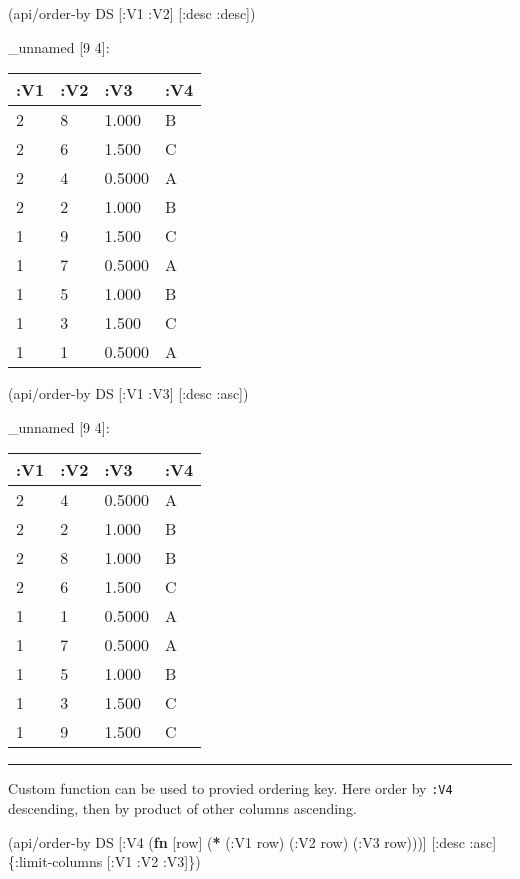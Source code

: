 \documentclass[]{article}
\newenvironment{Shaded}{\begin{snugshade}}{\end{snugshade}}
\newcommand{\KeywordTok}[1]{\textcolor[rgb]{0.13,0.29,0.53}{\textbf{#1}}}
\newcommand{\AttributeTok}[1]{\textcolor[rgb]{0.77,0.63,0.00}{#1}}
\newcommand{\NormalTok}[1]{#1}
\begin{document}
\begin{Shaded}
\begin{Highlighting}[]
\NormalTok{(api/order-by DS [}\AttributeTok{:V1} \AttributeTok{:V2}\NormalTok{] [}\AttributeTok{:desc} \AttributeTok{:desc}\NormalTok{])}
\end{Highlighting}
\end{Shaded}

\_unnamed {[}9 4{]}:

\begin{longtable}[]{@{}llll@{}}
\toprule
:V1 & :V2 & :V3 & :V4\tabularnewline
\midrule
\endhead
2 & 8 & 1.000 & B\tabularnewline
2 & 6 & 1.500 & C\tabularnewline
2 & 4 & 0.5000 & A\tabularnewline
2 & 2 & 1.000 & B\tabularnewline
1 & 9 & 1.500 & C\tabularnewline
1 & 7 & 0.5000 & A\tabularnewline
1 & 5 & 1.000 & B\tabularnewline
1 & 3 & 1.500 & C\tabularnewline
1 & 1 & 0.5000 & A\tabularnewline
\bottomrule
\end{longtable}

\begin{Shaded}
\begin{Highlighting}[]
\NormalTok{(api/order-by DS [}\AttributeTok{:V1} \AttributeTok{:V3}\NormalTok{] [}\AttributeTok{:desc} \AttributeTok{:asc}\NormalTok{])}
\end{Highlighting}
\end{Shaded}

\_unnamed {[}9 4{]}:

\begin{longtable}[]{@{}llll@{}}
\toprule
:V1 & :V2 & :V3 & :V4\tabularnewline
\midrule
\endhead
2 & 4 & 0.5000 & A\tabularnewline
2 & 2 & 1.000 & B\tabularnewline
2 & 8 & 1.000 & B\tabularnewline
2 & 6 & 1.500 & C\tabularnewline
1 & 1 & 0.5000 & A\tabularnewline
1 & 7 & 0.5000 & A\tabularnewline
1 & 5 & 1.000 & B\tabularnewline
1 & 3 & 1.500 & C\tabularnewline
1 & 9 & 1.500 & C\tabularnewline
\bottomrule
\end{longtable}

\begin{center}\rule{0.5\linewidth}{0.5pt}\end{center}

Custom function can be used to provied ordering key. Here order by
\texttt{:V4} descending, then by product of other columns ascending.

\begin{Shaded}
\begin{Highlighting}[]
\NormalTok{(api/order-by DS [}\AttributeTok{:V4}\NormalTok{ (}\KeywordTok{fn}\NormalTok{ [row] (}\KeywordTok{*}\NormalTok{ (}\AttributeTok{:V1}\NormalTok{ row)}
\NormalTok{                                  (}\AttributeTok{:V2}\NormalTok{ row)}
\NormalTok{                                  (}\AttributeTok{:V3}\NormalTok{ row)))] [}\AttributeTok{:desc} \AttributeTok{:asc}\NormalTok{] \{}\AttributeTok{:limit-columns}\NormalTok{ [}\AttributeTok{:V1} \AttributeTok{:V2} \AttributeTok{:V3}\NormalTok{]\})}
\end{Highlighting}
\end{Shaded}
\end{document}
